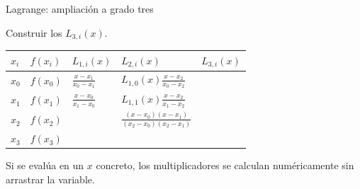 \documentclass[main.tex]{subfiles}
\begin{document}
\begin{frame}[t]{Lagrange: ampliación a grado tres}
\par\noindent\begin{minipage}[t][12mm][t]{\textwidth}\small\strut Construir los $L_{3,i}(x)$.\end{minipage}\par\nointerlineskip
\begin{minipage}[t]{\textwidth}\begingroup\scriptsize\setlength{\tabcolsep}{3pt}\begin{center}\begin{tabular}{|C{.065\textwidth}|C{.095\textwidth}|C{.19\textwidth}|C{.25\textwidth}|C{.25\textwidth}|}\hline
\rule[-2mm]{0pt}{6mm}$x_i$&$f(x_i)$&$L_{1,i}(x)$&$L_{2,i}(x)$&$L_{3,i}(x)$\\\hline
\rule[-2.5mm]{0pt}{9mm}$x_0$&$f(x_0)$&$\frac{x-x_1}{x_0-x_1}$&$L_{1,0}(x)\frac{x-x_2}{x_0-x_2}$&\\\hline
\rule[-2.5mm]{0pt}{9mm}$x_1$&$f(x_1)$&$\frac{x-x_0}{x_1-x_0}$&$L_{1,1}(x)\frac{x-x_2}{x_1-x_2}$&\\\hline
\rule[-2.5mm]{0pt}{9mm}$x_2$&$f(x_2)$&&$\frac{(x-x_0)(x-x_1)}{(x_2-x_0)(x_2-x_1)}$&\\\hline
\rule[-2.5mm]{0pt}{9mm}$x_3$&$f(x_3)$&&&\\\hline
\end{tabular}\end{center}\endgroup\par
\end{minipage}\par\small Si se evalúa en un $x$ concreto, los multiplicadores se calculan numéricamente sin arrastrar la variable.
\end{frame}
\end{document}
